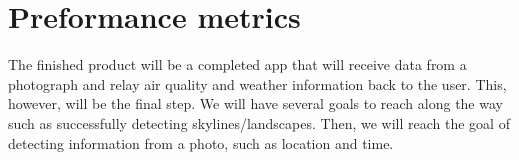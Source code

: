\documentclass[letterpaper,10pt, draftclsnofoot,onecolumn]{IEEEtran}
\begin{document}
\hrulefill

\section{Preformance metrics}
The finished product will be a completed app that will receive data from a photograph and relay air quality and weather information back to the user. This, however, will be the final step. We will have several goals to reach along the way such as successfully detecting skylines/landscapes. Then, we will reach the goal of detecting information from a photo, such as location and time.
\end{document}
